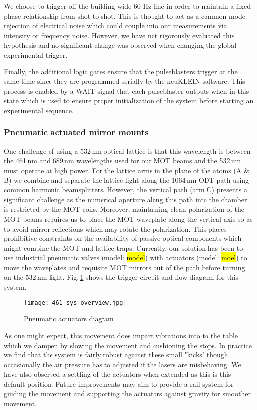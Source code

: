 We choose to trigger off the building wide 60 Hz line in order to maintain a fixed phase relationship from shot to shot.
This is thought to act as a common-mode rejection of electrical noise which could couple into our measurements via intensity or frequency noise.
However, we have not rigorously evaluated this hypothesis and no significant change was observed when changing the global experimental trigger.

Finally, the additional logic gates ensure that the pulseblasters trigger at the same time since they are programmed serially by the neuKLEIN software.
This process is enabled by a WAIT signal that each pulseblaster outputs when in this state which is used to ensure proper initialization of the system before starting an experimental sequence.

\subsubsection{Pneumatic actuated mirror mounts}
One challenge of using a 532\,nm optical lattice is that this wavelength is between the 461\,nm and 689\,nm wavelengths used for our MOT beams and the 532\,nm must operate at high power.
For the lattice arms in the plane of the atoms (A \& B) we combine and separate the lattice light along the 1064\,nm ODT path using common harmonic beamsplitters.
However, the vertical path (arm C) presents a significant challenge as the numerical aperture along this path into the chamber is restricted by the MOT coils.
Moreover, maintaining clean polarization of the MOT beams requires us to place the MOT waveplate along the vertical axis so as to avoid mirror reflections which may rotate the polarization.
This places prohibitive constraints on the availability of passive optical components which might combine the MOT and lattice traps.
Currently, our solution has been to use industrial pneumatic valves (model: \hl{model}) with actuators (model: \hl{moel}) to move the waveplates and requisite MOT mirrors out of the path before turning on the 532\,nm light.
Fig.\,\ref{fig:pnuSys} shows the trigger circuit and flow diagram for this system.
	\begin{figure}
		\centerline{
		\texttt{[image: 461\_sys\_overview.jpg]}}
		\caption{Pneumatic actuators diagram}
		\label{fig:pnuSys}
	\end{figure} 
As one might expect, this movement does impart vibrations into to the table which we dampen by slowing the movement and cushioning the stops.
In practice we find that the system is fairly robust against these small "kicks" though occasionally the air pressure has to adjusted if the lasers are misbehaving.
We have also observed a settling of the actuators when extended as this is this default position.
Future improvements may aim to provide a rail system for guiding the movement and supporting the actuators against gravity for smoother movement.